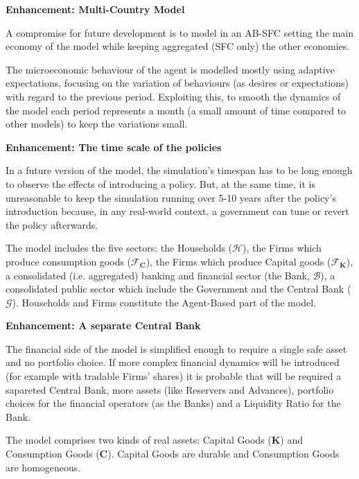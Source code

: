 \documentclass[a4paper, headings=standardclasses]{scrartcl}
\newenvironment{enh}[1][]{\begin{framed}\noindent\textbf{Enhancement: #1}\par}{\end{framed}}
\begin{document}
\begin{enh}[Multi-Country Model]
    A compromise for future development is to model in an AB-SFC setting the main economy of the model while keeping aggregated (SFC only) the other economies.
\end{enh}

The microeconomic behaviour of the agent is modelled mostly using adaptive expectations, focusing on the variation of behaviours (as desires or expectations) with regard to the previous period.
Exploiting this, to smooth the dynamics of the model each period represents a month (a small amount of time compared to other models) to keep the variations small.

\begin{enh}[The time scale of the policies]
    In a future version of the model, the simulation's timespan has to be long enough to observe the effects of introducing a policy. But, at the same time, it is unreasonable to keep the simulation running over 5-10 years after the policy's introduction because, in any real-world context, a government can tune or revert the policy afterwards.
\end{enh}

The model includes the five sectors: the Households ($\mathcal{H}$), the Firms which produce consumption goods ($\mathcal{F}_{\mathbf{C}}$), the Firms which produce Capital goods ($\mathcal{F}_{\mathbf{K}}$), a consolidated (i.e. aggregated) banking and financial sector (the Bank, $\mathcal{B}$), a consolidated public sector which include the Government and the Central Bank ($\mathcal{G}$). Households and Firms constitute the Agent-Based part of the model.

\begin{enh}[A separate Central Bank]
    The financial side of the model is simplified enough to require a single safe asset and no portfolio choice.
    If more complex financial dynamics will be introduced (for example with tradable Firms' shares) it is probable that will be required a sapareted Central Bank, more assets (like Reservers and Advances), portfolio choices for the financial operators (as the Banks) and a Liquidity Ratio for the Bank.
\end{enh}

The model comprises two kinds of real assets: Capital Goods ($\mathbf{K}$) and Consumption Goods ($\mathbf{C}$).
Capital Goods are durable and Consumption Goods are homogeneous.
\end{document}
